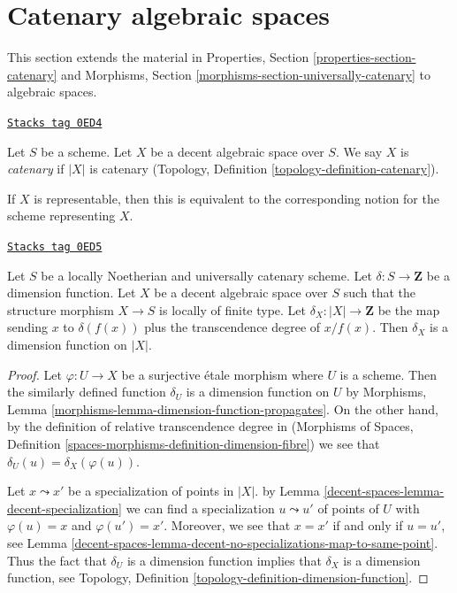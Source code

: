 \section{Catenary algebraic spaces}
\label{decent-spaces-section-catenary}
This section extends the material in
Properties, Section \ref{properties-section-catenary}
and Morphisms, Section \ref{morphisms-section-universally-catenary}
to algebraic spaces.

\begin{definition}[Catenary]
\label{decent-spaces-definition-catenary}
\href{https://stacks.math.columbia.edu/tag/0ED4}{\texttt{Stacks tag 0ED4}}

Let $S$ be a scheme. Let $X$ be a decent algebraic space over $S$.
We say $X$ is {\it catenary} if $|X|$ is catenary
(Topology, Definition \ref{topology-definition-catenary}).
\end{definition}

If $X$ is representable, then this is equivalent to the corresponding notion
for the scheme representing $X$.

\begin{lemma}
\label{decent-spaces-lemma-scheme-with-dimension-function}
\href{https://stacks.math.columbia.edu/tag/0ED5}{\texttt{Stacks tag 0ED5}}

Let $S$ be a locally Noetherian and universally catenary scheme.
Let $\delta : S \to \mathbf{Z}$ be a dimension function.
Let $X$ be a decent algebraic space over $S$ such that
the structure morphism $X \to S$ is locally of
finite type. Let $\delta_X : |X| \to \mathbf{Z}$ be the map
sending $x$ to $\delta(f(x))$ plus the transcendence degree
of $x/f(x)$. Then $\delta_X$ is a dimension function on $|X|$.
\end{lemma}

\begin{proof}
Let $\varphi : U \to X$ be a surjective \'etale morphism where $U$ is a scheme.
Then the similarly defined function $\delta_U$ is a
dimension function on $U$ by
Morphisms, Lemma \ref{morphisms-lemma-dimension-function-propagates}.
On the other hand, by the definition of relative transcendence degree in
(Morphisms of Spaces, Definition
\ref{spaces-morphisms-definition-dimension-fibre}) we see
that $\delta_U(u) = \delta_X(\varphi(u))$.

\medskip\noindent
Let $x \leadsto x'$ be a specialization of points in $|X|$.
by Lemma \ref{decent-spaces-lemma-decent-specialization} we can find
a specialization $u \leadsto u'$ of points of $U$ with
$\varphi(u) = x$ and $\varphi(u') = x'$. Moreover, we see
that $x = x'$ if and only if $u = u'$, see
Lemma \ref{decent-spaces-lemma-decent-no-specializations-map-to-same-point}.
Thus the fact that $\delta_U$ is a dimension function implies that
$\delta_X$ is a dimension function, see
Topology, Definition \ref{topology-definition-dimension-function}.
\end{proof}

